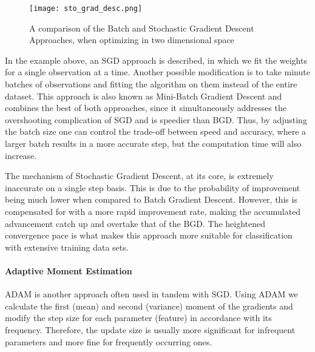 		\begin{figure}[H]
			\centering
			\captionsetup{width=0.8\textwidth}
			\texttt{[image: sto\_grad\_desc.png]}
			\caption[Batch and Stochastic Gradient Descent]{
				A comparison of the Batch and Stochastic Gradient Descent Approaches, when optimizing in two dimensional space
			} 
			\label{ann_sto_grad_desc}
		\end{figure}
	
		In the example above, an SGD approach is described, in which we fit the weights for a single observation at a time. Another possible modification is to take minute batches of observations and fitting the algorithm on them instead of the entire dataset. This approach is also known as Mini-Batch Gradient Descent and combines the best of both approaches, since it simultaneously addresses the overshooting complication of SGD and is speedier than BGD. Thus, by adjusting the batch size one can control the trade-off between speed and accuracy, where a larger batch results in a more accurate step, but the computation time will also increase. 
		
		\par
		
		The mechanism of Stochastic Gradient Descent, at its core, is extremely inaccurate on a single step basis. This is due to the probability of improvement being much lower when compared to Batch Gradient Descent. However, this is compensated for with a more rapid improvement rate, making the accumulated advancement catch up and overtake that of the BGD. The heightened convergence pace is what makes this approach more suitable for classification with extensive training data sets.
		
	\paragraph{Adaptive Moment Estimation}
		ADAM is another approach often used in tandem with SGD. Using ADAM we calculate the first (mean) and second (variance) moment of the gradients and modify the step size for each parameter (feature) in accordance with its frequency. Therefore, the update size is usually more significant for infrequent parameters and more fine for frequently occurring ones.
			
		 

				
				